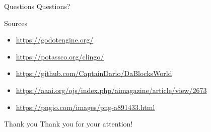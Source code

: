 \documentclass[12pt]{beamer}
\begin{document}
    \begin{frame}[fragile]{Questions}
        Questions?  
    \end{frame}

    \begin{frame}[fragile]{Sources}
        \begin{itemize}
            \item \url{https://godotengine.org/}
            \item \url{https://potassco.org/clingo/}
            \item \url{https://github.com/CaptainDario/DaBlocksWorld}
            \item \url{https://aaai.org/ojs/index.php/aimagazine/article/view/2673}
            \item \url{https://pngio.com/images/png-a891433.html}
        \end{itemize}
    \end{frame}

    \begin{frame}[fragile]{Thank you}
       Thank you for your attention!
    \end{frame}
\end{document}
